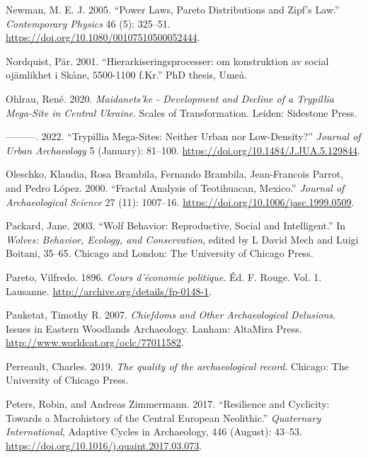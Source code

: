 \documentclass[
  12pt,
  a4paper, twoside]{book}
\newlength{\cslhangindent}
\newlength{\cslentryspacingunit} %
\newenvironment{CSLReferences}[2] %
 {%
  \setlength{\parindent}{0pt}
  \ifodd #1
  \let\oldpar\par
  \def\par{\hangindent=\cslhangindent\oldpar}
  \fi
  \setlength{\parskip}{#2\cslentryspacingunit}
 }%
 {}
\begin{document}
\begin{CSLReferences}{1}{0}
\leavevmode{}%
Newman, M. E. J. 2005. {``Power Laws, Pareto Distributions and Zipf's Law.''} \emph{Contemporary Physics} 46 (5): 325--51. \url{https://doi.org/10.1080/00107510500052444}.

\leavevmode{}%
Nordquist, Pär. 2001. {``Hierarkiseringsprocesser: om konstruktion av social ojämlikhet i Skåne, 5500-1100 f.Kr.''} PhD thesis, Umeå.

\leavevmode{}%
Ohlrau, René. 2020. \emph{Maidanets'ke - Development and Decline of a Trypillia Mega-Site in Central Ukraine}. Scales of Transformation. Leiden: Sidestone Press.

\leavevmode{}%
---------. 2022. {``Trypillia Mega-Sites: Neither Urban nor Low-Density?''} \emph{Journal of Urban Archaeology} 5 (January): 81--100. \url{https://doi.org/10.1484/J.JUA.5.129844}.

\leavevmode{}%
Oleschko, Klaudia, Rosa Brambila, Fernando Brambila, Jean-Francois Parrot, and Pedro López. 2000. {``Fractal Analysis of Teotihuacan, Mexico.''} \emph{Journal of Archaeological Science} 27 (11): 1007--16. \url{https://doi.org/10.1006/jasc.1999.0509}.

\leavevmode{}%
Packard, Jane. 2003. {``Wolf Behavior: Reproductive, Social and Intelligent.''} In \emph{Wolves: Behavior, Ecology, and Conservation}, edited by L David Mech and Luigi Boitani, 35--65. {Chicago and London}: {The University of Chicago Press}.

\leavevmode{}%
Pareto, Vilfredo. 1896. \emph{Cours d'économie politique}. Éd. F. Rouge. Vol. 1. Lausanne. \url{http://archive.org/details/fp-0148-1}.

\leavevmode{}%
Pauketat, Timothy R. 2007. \emph{Chiefdoms and Other Archaeological Delusions}. Issues in Eastern Woodlands Archaeology. Lanham: AltaMira Press. \url{http://www.worldcat.org/oclc/77011582}.

\leavevmode{}%
Perreault, Charles. 2019. \emph{The quality of the archaeological record}. Chicago: The University of Chicago Press.

\leavevmode{}%
Peters, Robin, and Andreas Zimmermann. 2017. {``Resilience and Cyclicity: Towards a Macrohistory of the Central European Neolithic.''} \emph{Quaternary International}, Adaptive Cycles in Archaeology, 446 (August): 43--53. \url{https://doi.org/10.1016/j.quaint.2017.03.073}.


\end{CSLReferences}
\end{document}
